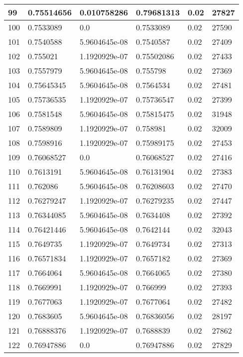 \begin{longtable}{|l|l|l|l|l|l|}
99 & 0.75514656 & 0.010758286 & 0.79681313 & 0.02 & 27827 \\ \hline 
100 & 0.7533089 & 0.0 & 0.7533089 & 0.02 & 27590 \\ \hline 
101 & 0.7540588 & 5.9604645e-08 & 0.7540587 & 0.02 & 27409 \\ \hline 
102 & 0.755021 & 1.1920929e-07 & 0.75502086 & 0.02 & 27433 \\ \hline 
103 & 0.7557979 & 5.9604645e-08 & 0.755798 & 0.02 & 27369 \\ \hline 
104 & 0.75645345 & 5.9604645e-08 & 0.7564534 & 0.02 & 27481 \\ \hline 
105 & 0.75736535 & 1.1920929e-07 & 0.75736547 & 0.02 & 27399 \\ \hline 
106 & 0.7581548 & 5.9604645e-08 & 0.75815475 & 0.02 & 31948 \\ \hline 
107 & 0.7589809 & 1.1920929e-07 & 0.758981 & 0.02 & 32009 \\ \hline 
108 & 0.7598916 & 1.1920929e-07 & 0.75989175 & 0.02 & 27453 \\ \hline 
109 & 0.76068527 & 0.0 & 0.76068527 & 0.02 & 27416 \\ \hline 
110 & 0.7613191 & 5.9604645e-08 & 0.76131904 & 0.02 & 27383 \\ \hline 
111 & 0.762086 & 5.9604645e-08 & 0.76208603 & 0.02 & 27470 \\ \hline 
112 & 0.76279247 & 1.1920929e-07 & 0.76279235 & 0.02 & 27447 \\ \hline 
113 & 0.76344085 & 5.9604645e-08 & 0.7634408 & 0.02 & 27392 \\ \hline 
114 & 0.76421446 & 5.9604645e-08 & 0.7642144 & 0.02 & 32043 \\ \hline 
115 & 0.7649735 & 1.1920929e-07 & 0.7649734 & 0.02 & 27313 \\ \hline 
116 & 0.76571834 & 1.1920929e-07 & 0.7657182 & 0.02 & 27369 \\ \hline 
117 & 0.7664064 & 5.9604645e-08 & 0.7664065 & 0.02 & 27380 \\ \hline 
118 & 0.7669991 & 1.1920929e-07 & 0.766999 & 0.02 & 27393 \\ \hline 
119 & 0.7677063 & 1.1920929e-07 & 0.7677064 & 0.02 & 27482 \\ \hline 
120 & 0.7683605 & 5.9604645e-08 & 0.76836056 & 0.02 & 28197 \\ \hline 
121 & 0.76888376 & 1.1920929e-07 & 0.7688839 & 0.02 & 27862 \\ \hline 
122 & 0.76947886 & 0.0 & 0.76947886 & 0.02 & 27829 \\ \hline 

\end{longtable}

